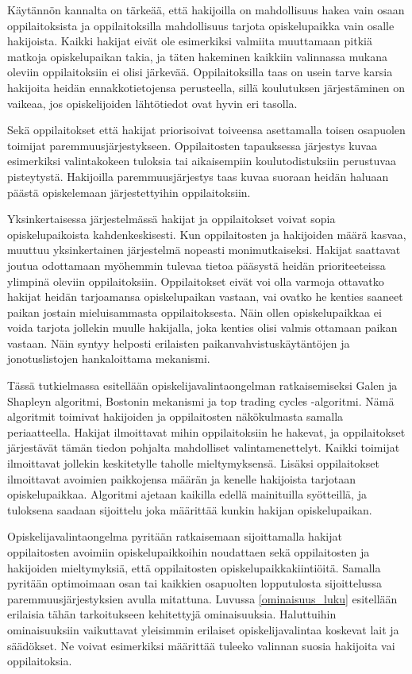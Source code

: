 \documentclass[gradu, twoside]{tktltiki}
\begin{document}
Käytännön kannalta on tärkeää, että hakijoilla on mahdollisuus hakea
vain osaan oppilaitoksista ja oppilaitoksilla mahdollisuus tarjota
opiskelupaikka vain osalle hakijoista. Kaikki hakijat eivät ole
esimerkiksi valmiita muuttamaan pitkiä matkoja opiskelupaikan takia,
ja täten hakeminen kaikkiin valinnassa mukana oleviin oppilaitoksiin
ei olisi järkevää. Oppilaitoksilla taas on usein tarve karsia
hakijoita heidän ennakkotietojensa perusteella, sillä koulutuksen
järjestäminen on vaikeaa, jos opiskelijoiden lähtötiedot ovat hyvin
eri tasolla.

Sekä oppilaitokset että hakijat priorisoivat toiveensa asettamalla
toisen osapuolen toimijat paremmuusjärjestykseen. Oppilaitosten
tapauksessa järjestys kuvaa esimerkiksi valintakokeen tuloksia tai
aikaisempiin koulutodistuksiin perustuvaa pisteytystä. Hakijoilla
paremmuusjärjestys taas kuvaa suoraan heidän haluaan päästä
opiskelemaan järjestettyihin oppilaitoksiin.

Yksinkertaisessa järjestelmässä hakijat ja oppilaitokset voivat sopia
opiskelupaikoista kahdenkeskisesti. Kun oppilaitosten ja hakijoiden
määrä kasvaa, muuttuu yksinkertainen järjestelmä nopeasti
monimutkaiseksi. Hakijat saattavat joutua odottamaan myöhemmin tulevaa
tietoa pääsystä heidän prioriteeteissa ylimpinä oleviin
oppilaitoksiin. Oppilaitokset eivät voi olla varmoja ottavatko hakijat
heidän tarjoamansa opiskelupaikan vastaan, vai ovatko he kenties
saaneet paikan jostain mieluisammasta oppilaitoksesta. Näin ollen
opiskelupaikkaa ei voida tarjota jollekin muulle hakijalla, joka
kenties olisi valmis ottamaan paikan vastaan. Näin syntyy helposti
erilaisten paikanvahvistuskäytäntöjen ja jonotuslistojen hankaloittama
mekanismi.

Tässä tutkielmassa esitellään opiskelijavalintaongelman
ratkaisemiseksi Galen ja Shapleyn algoritmi, Bostonin mekanismi ja top
trading cycles -algoritmi. Nämä algoritmit toimivat hakijoiden ja
oppilaitosten näkökulmasta samalla periaatteella. Hakijat ilmoittavat
mihin oppilaitoksiin he hakevat, ja oppilaitokset järjestävät tämän
tiedon pohjalta mahdolliset valintamenettelyt. Kaikki toimijat
ilmoittavat jollekin keskitetylle taholle mieltymyksensä. Lisäksi
oppilaitokset ilmoittavat avoimien paikkojensa määrän ja kenelle
hakijoista tarjotaan opiskelupaikkaa. Algoritmi ajetaan kaikilla
edellä mainituilla syötteillä, ja tuloksena saadaan sijoittelu joka
määrittää kunkin hakijan opiskelupaikan.

Opiskelijavalintaongelma pyritään ratkaisemaan sijoittamalla hakijat
oppilaitosten avoimiin opiskelupaikkoihin noudattaen sekä
oppilaitosten ja hakijoiden mieltymyksiä, että oppilaitosten
opiskelupaikkakiintiöitä. Samalla pyritään optimoimaan osan tai
kaikkien osapuolten lopputulosta sijoittelussa paremmuusjärjestyksien
avulla mitattuna. Luvussa \ref{ominaisuus_luku} esitellään erilaisia
tähän tarkoitukseen kehitettyjä ominaisuuksia. Haluttuihin
ominaisuuksiin vaikuttavat yleisimmin erilaiset opiskelijavalintaa
koskevat lait ja säädökset. Ne voivat esimerkiksi määrittää tuleeko
valinnan suosia hakijoita vai oppilaitoksia.
\end{document}
